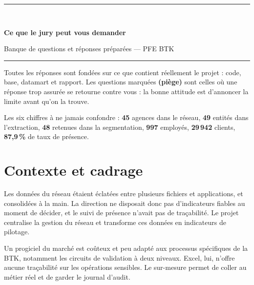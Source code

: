 \documentclass[a4paper,11pt]{article}
\begin{document}
\begin{center}
{\color{btkblue}\rule{\textwidth}{2pt}}\\[0.3cm]
{\huge\bfseries\color{btkblue} Ce que le jury peut vous demander\par}
\vspace{0.2cm}
{\large Banque de questions et réponses préparées --- PFE BTK\par}
\vspace{0.2cm}
{\color{btkblue}\rule{\textwidth}{2pt}}
\end{center}

\vspace{0.5cm}
\begin{note}
Toutes les réponses sont fondées sur ce que contient réellement le projet :
code, base, datamart et rapport. Les questions marquées \textbf{(piège)} sont
celles où une réponse trop assurée se retourne contre vous : la bonne attitude
est d'annoncer la limite avant qu'on la trouve.
\end{note}

\vspace{0.3cm}
\begin{coeur}
Les six chiffres à ne jamais confondre : \textbf{45} agences dans le réseau,
\textbf{49} entités dans l'extraction, \textbf{48} retenues dans la
segmentation, \textbf{997} employés, \textbf{29\,942} clients,
\textbf{87,9\,\%} de taux de présence.
\end{coeur}

\section{Contexte et cadrage}

Les données du réseau étaient éclatées entre plusieurs fichiers et applications,
et consolidées à la main. La direction ne disposait donc pas d'indicateurs
fiables au moment de décider, et le suivi de présence n'avait pas de traçabilité.
Le projet centralise la gestion du réseau et transforme ces données en
indicateurs de pilotage.

Un progiciel du marché est coûteux et peu adapté aux processus spécifiques de la
BTK, notamment les circuits de validation à deux niveaux. Excel, lui, n'offre
aucune traçabilité sur les opérations sensibles. Le sur-mesure permet de coller
au métier réel et de garder le journal d'audit.
\end{document}

